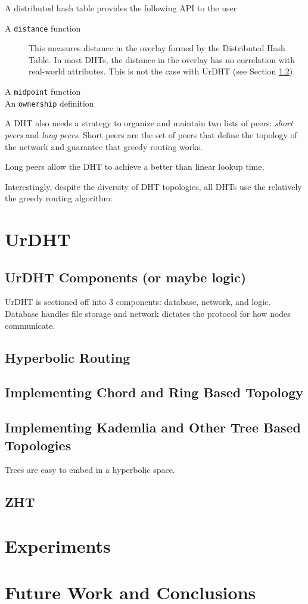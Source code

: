 \documentclass[11pt,conference]{IEEEtran}
\begin{document}
A distributed hash table provides the following API to the user


\begin{description}
	\item [A \texttt{distance} function] \qquad
	This measures distance in the overlay formed by the Distributed Hash Table.
	In most DHTs, the distance in the overlay has no correlation with real-world attributes.
	This is not the case with UrDHT (see Section \ref{sec:hyper}).
	
	\item [A \texttt{midpoint} function]  %
	\item [An \texttt{ownership} definition]
\end{description}


A DHT also needs a strategy to organize and maintain two lists of peers: \textit{short peers} and \textit{long peers}.
Short peers are the set of peers that define the topology of the network and guarantee that greedy routing works.

Long peers allow the DHT to achieve a better than linear lookup time, 

Interestingly, despite the diversity of DHT topologies, all DHTs use the relatively the greedy routing algorithm:

\section{UrDHT}
\label{sec:urdht}
	\subsection{UrDHT Components (or maybe logic)}
	
	UrDHT is sectioned off into 3 components: database, network, and logic.
	Database handles file storage and network dictates the protocol for how nodes communicate.

	
	\subsection{Hyperbolic Routing}
	\label{sec:hyper}
	
	\subsection{Implementing Chord and Ring Based Topology}
	
	
	\subsection{Implementing Kademlia and Other Tree Based Topologies}
	
	
	Trees are easy to embed in a hyperbolic space.
	\subsection{ZHT}
	
\section{Experiments}
\label{sec:experiments}

\section{Future Work and Conclusions}
\label{sec:future}
\end{document}
